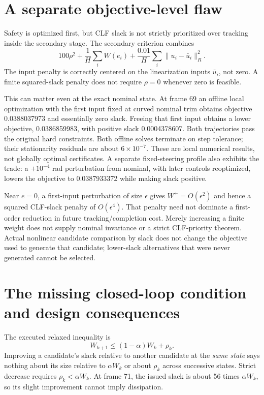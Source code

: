 \documentclass[11pt]{article}
\begin{document}
\section{A separate objective-level flaw}
Safety is optimized first, but CLF slack is not strictly prioritized over
tracking inside the secondary stage. The secondary criterion combines
\[
100\rho^2+\frac1H\sum_i W(e_i)
 +\frac{0.01}{H}\sum_i\|u_i-\bar u_i\|_R^2.
\]
The input penalty is correctly centered on the linearization inputs
$\bar u_i$, not zero. A finite squared-slack penalty does not require
$\rho=0$ whenever zero is feasible.

This can matter even at the exact nominal state. At frame 69 an offline
local optimization with the first input fixed at curved nominal trim obtains
objective 0.0388037973 and essentially zero slack. Freeing that first input
obtains a lower objective, 0.0386859983, with positive slack 0.0004378607.
Both trajectories pass the original hard constraints. Both offline solves
terminate on step tolerance; their stationarity residuals are about
$6\times10^{-7}$. These are local numerical results, not globally optimal
certificates. A separate fixed-steering profile also exhibits the trade:
a $+10^{-4}$ rad perturbation from nominal, with later controls reoptimized,
lowers the objective to 0.0387933372 while making slack positive.

Near $e=0$, a first-input perturbation of size $\epsilon$ gives
$W^+=O(\epsilon^2)$ and hence a squared CLF-slack penalty of
$O(\epsilon^4)$. That penalty need not dominate a first-order reduction in
future tracking/completion cost. Merely increasing a finite weight does not
supply nominal invariance or a strict CLF-priority theorem. Actual nonlinear
candidate comparison by slack does not change the objective used to generate
that candidate; lower-slack alternatives that were never generated cannot
be selected.

\section{The missing closed-loop condition and design consequences}
The executed relaxed inequality is
\[
W_{k+1}\le(1-\alpha)W_k+\rho_k.
\]
Improving a candidate's slack relative to another candidate at the
\emph{same state} says nothing about its size relative to $\alpha W_k$ or
about $\rho_k$ across successive states. Strict decrease requires
$\rho_k<\alpha W_k$. At frame 71, the issued slack is about 56 times
$\alpha W_k$, so its slight improvement cannot imply dissipation.
\end{document}
